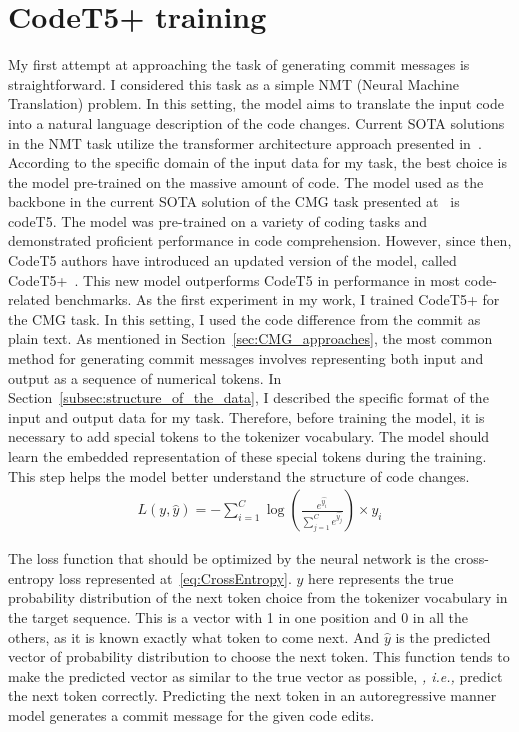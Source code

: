 \section{CodeT5+ training}\label{sec:codeT5_train}
My first attempt at approaching the task of generating commit messages is straightforward. I considered this task as a simple NMT (Neural Machine Translation) problem. In this setting, the model aims to translate the input code into a natural language description of the code changes. Current SOTA solutions in the NMT task utilize the transformer architecture approach presented in~\cite{vaswani2017attention}. According to the specific domain of the input data for my task, the best choice is the model pre-trained on the massive amount of code. The model used as the backbone in the current SOTA solution of the CMG task presented at~{}\cite{eliseeva2023commit} is codeT5. The model was pre-trained on a variety of coding tasks and demonstrated proficient performance in code comprehension. However, since then, CodeT5 authors have introduced an updated version of the model, called CodeT5+~\cite{wang2023codet5+}. This new model outperforms CodeT5 in performance in most code-related benchmarks. As the first experiment in my work, I trained CodeT5+ for the CMG task. In this setting, I used the code difference from the commit as plain text. 
As mentioned in Section~\ref{sec:CMG_approaches}, the most common method for generating commit messages involves representing both input and output as a sequence of numerical tokens. In Section~\ref{subsec:structure_of_the_data}, I described the specific format of the input and output data for my task. Therefore, before training the model, it is necessary to add special tokens to the tokenizer vocabulary. The model should learn the embedded representation of these special tokens during the training. This step helps the model better understand the structure of code changes.
\begin{align}
    \label{eq:CrossEntropy}
    L(y, \hat{y}) = -\sum_{i=1}^{C} \log \left( \frac{e^{\hat{y_i}}}{\sum_{j=1}^{C} e^{\hat{y_{j}}}} \right) \times y_i
\end{align}

The loss function that should be optimized by the neural network is the cross-entropy loss represented at~\ref{eq:CrossEntropy}. $y$ here represents the true probability distribution of the next token choice from the tokenizer vocabulary in the target sequence. This is a vector with 1 in one position and 0 in all the others, as it is known exactly what token to come next. And $\hat{y}$ is the predicted vector of probability distribution to choose the next token.  This function tends to make the predicted vector as similar to the true vector as possible, \textit{, i.e.,} predict the next token correctly. Predicting the next token in an autoregressive manner model generates a commit message for the given code edits. 

